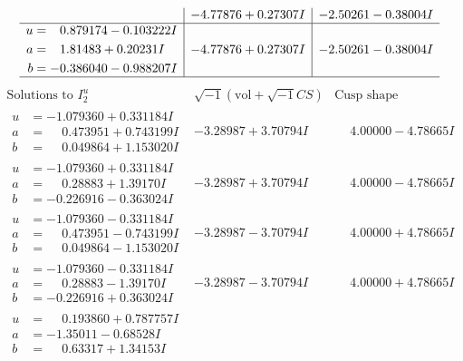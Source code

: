 \documentclass[1p]{elsarticle_modified}
\theoremstyle{definition}
\newcommand{\I}{\sqrt{-1}}
\begin{document}
$$\begin{array}{c|c|c}
 & -4.77876 + 0.27307 I & -2.50261 - 0.38004 I \\ \hline\begin{aligned}
u &= \phantom{-}0.879174 - 0.103222 I \\
a &= \phantom{-}1.81483 + 0.20231 I \\
b &= -0.386040 - 0.988207 I\end{aligned}
 & -4.77876 + 0.27307 I & -2.50261 - 0.38004 I\\
 \hline 
 \end{array}$$\newpage$$\begin{array}{c|c|c}  
\text{Solutions to }I^u_{2}& \I (\text{vol} + \sqrt{-1}CS) & \text{Cusp shape}\\
 \hline 
\begin{aligned}
u &= -1.079360 + 0.331184 I \\
a &= \phantom{-}0.473951 + 0.743199 I \\
b &= \phantom{-}0.049864 + 1.153020 I\end{aligned}
 & -3.28987 + 3.70794 I & \phantom{-}4.00000 - 4.78665 I \\ \hline\begin{aligned}
u &= -1.079360 + 0.331184 I \\
a &= \phantom{-}0.28883 + 1.39170 I \\
b &= -0.226916 - 0.363024 I\end{aligned}
 & -3.28987 + 3.70794 I & \phantom{-}4.00000 - 4.78665 I \\ \hline\begin{aligned}
u &= -1.079360 - 0.331184 I \\
a &= \phantom{-}0.473951 - 0.743199 I \\
b &= \phantom{-}0.049864 - 1.153020 I\end{aligned}
 & -3.28987 - 3.70794 I & \phantom{-}4.00000 + 4.78665 I \\ \hline\begin{aligned}
u &= -1.079360 - 0.331184 I \\
a &= \phantom{-}0.28883 - 1.39170 I \\
b &= -0.226916 + 0.363024 I\end{aligned}
 & -3.28987 - 3.70794 I & \phantom{-}4.00000 + 4.78665 I \\ \hline\begin{aligned}
u &= \phantom{-}0.193860 + 0.787757 I \\
a &= -1.35011 - 0.68528 I \\
b &= \phantom{-}0.63317 + 1.34153 I\end{aligned}

\end{array}$$
\end{document}
